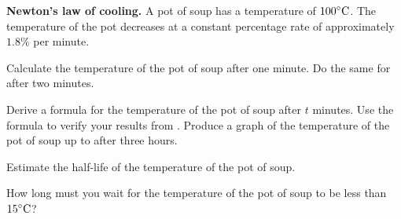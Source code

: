 \documentclass[a4paper,oneside,12pt]{article}
\begin{document}
\begin{exercise}
\textbf{Newton's law of cooling.}
A pot of soup has a temperature of ${100}^{\circ}\textrm{C}$.  The temperature
of the pot decreases at a constant percentage rate of approximately
$1.8\%$ per minute.
\begin{packedenum}
\item\label{subex:exponential:soup_temperature_1minute_2minutes}
  Calculate the temperature of the pot of soup after one minute.  Do
  the same for after two minutes.

\item\label{subex:exponential:soup_temperature_formula_graph}
  Derive a formula for the temperature of the pot of soup after $t$
  minutes.  Use the formula to verify your results
  from .
  Produce a graph of the temperature of the pot of soup up to after
  three hours.

\item\label{subex:exponential:soup_temperature_half_life}
  Estimate the half-life of the temperature of the pot of soup.

\item\label{subex:exponential:soup_temperature_15_degrees}
  How long must you wait for the temperature of the pot of soup to be
  less than ${15}^{\circ}\textrm{C}$?
\end{packedenum}
\end{exercise}
\end{document}
